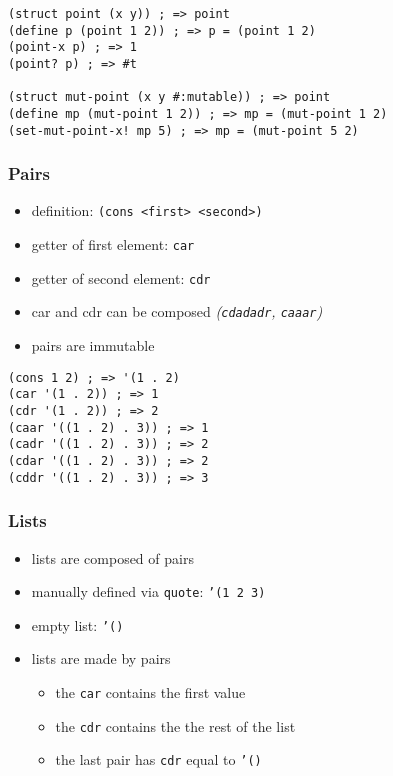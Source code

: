 \documentclass[a4paper,landscape,10pt]{article}
\begin{document}
\begin{multicols*}{2}
  \begin{lstlisting}[language=Racket]
(struct point (x y)) ; => point
(define p (point 1 2)) ; => p = (point 1 2)
(point-x p) ; => 1
(point? p) ; => #t

(struct mut-point (x y #:mutable)) ; => point
(define mp (mut-point 1 2)) ; => mp = (mut-point 1 2)
(set-mut-point-x! mp 5) ; => mp = (mut-point 5 2)
\end{lstlisting}

  \subsubsection{Pairs}

  \begin{itemize}
    \item definition: \texttt{(cons <first> <second>)}
    \item getter of first element: \texttt{car}
    \item getter of second element: \texttt{cdr}
    \item car and cdr can be composed \textit{(\texttt{cdadadr}, \texttt{caaar})}
    \item pairs are immutable
  \end{itemize}

  \begin{lstlisting}[language=Racket, morekeywords={caar, cadr, cdar, cddr}]
(cons 1 2) ; => '(1 . 2)
(car '(1 . 2)) ; => 1
(cdr '(1 . 2)) ; => 2
(caar '((1 . 2) . 3)) ; => 1
(cadr '((1 . 2) . 3)) ; => 2
(cdar '((1 . 2) . 3)) ; => 2
(cddr '((1 . 2) . 3)) ; => 3
\end{lstlisting}

  \subsubsection{Lists}

  \begin{itemize}
    \item lists are composed of pairs
    \item manually defined via \texttt{quote}: \texttt{'(1 2 3)}
    \item empty list: \texttt{'()}
    \item lists are made by pairs
          \begin{itemize} \item the \texttt{car} contains the first value
            \item the \texttt{cdr} contains the the rest of the list
            \item the last pair has \texttt{cdr} equal to \texttt{'()}
          \end{itemize}
  \end{itemize}


\end{multicols*}
\end{document}
